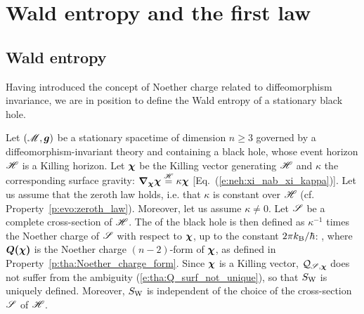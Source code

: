 
\section{Wald entropy and the first law}

\subsection{Wald entropy}

Having introduced the concept of Noether charge related to diffeomorphism invariance,
we are in position to define the Wald entropy of a stationary black hole.

\begin{prop}
Let $(\mathscr{M},\bm{g})$ be a stationary spacetime of dimension $n\geq 3$ governed
by a diffeomorphism-invariant theory and containing a black hole, whose
event horizon $\mathscr{H}$ is a Killing horizon. Let $\bm{\chi}$ be the Killing
vector generating $\mathscr{H}$ and $\kappa$ the corresponding surface gravity:
$\bm{\nabla}_{\bm{\chi}}\bm{\chi} \stackrel{\mathscr{H}}{=} \kappa \bm{\chi}$ [Eq.~(\ref{e:neh:xi_nab_xi_kappa})].
Let us assume that the zeroth law holds, i.e. that $\kappa$ is constant over $\mathscr{H}$
(cf. Property~\ref{p:evo:zeroth_law}). Moreover,  let us assume $\kappa \neq 0$.
Let $\mathscr{S}$ be a complete cross-section of $\mathscr{H}$.
The  of the black hole is
then defined as $\kappa^{-1}$ times
the Noether charge of $\mathscr{S}$ with respect to $\bm{\chi}$,
up to the constant $2\pi k_{\rm B}/\hbar$:
\be \label{e:tha:def_Wald_entropy}
     ,
\ee
where $\bm{Q}\textbf{(}\bm{\chi}\textbf{)}$ is the Noether charge $(n-2)$-form of $\bm{\chi}$,
as defined in Property~\ref{p:tha:Noether_charge_form}.
Since $\bm{\chi}$ is a Killing vector, $\mathcal{Q}_{\mathscr{S},\bm{\chi}}$ does not suffer from
the ambiguity (\ref{e:tha:Q_surf_not_unique}), so that $S_{\rm W}$ is uniquely defined.
Moreover, $S_{\rm W}$ is independent of the choice of the cross-section $\mathscr{S}$ of $\mathscr{H}$.
\end{prop}

